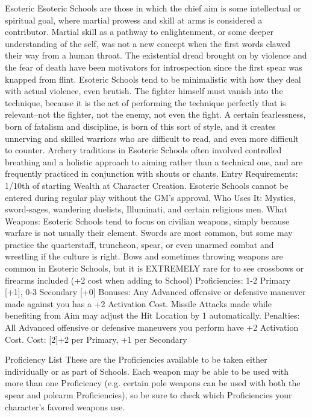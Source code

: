 \documentclass[oneside,11pt,english]{book}
\begin{document}
Esoteric 
Esoteric Schools are those in which the chief aim is some intellectual or spiritual goal, where martial 
prowess and skill at arms is considered a contributor. Martial skill as a pathway to enlightenment, or some 
deeper understanding of the self, was not a new concept when the first words clawed their way from a 
human throat. The existential dread brought on by violence and the fear of death have been motivators for 
introspection since the first spear was knapped from flint. 
Esoteric Schools tend to be minimalistic with how they deal with actual violence, even brutish. The 
fighter himself must vanish into the technique, because it is the act of performing the technique perfectly 
that is relevant--not the fighter, not the enemy, not even the fight. A certain fearlessness, born of fatalism 
and discipline, is born of this sort of style, and it creates unnerving and skilled warriors who are difficult 
to read, and even more difficult to counter. Archery traditions in Esoteric Schools often involved 
controlled breathing and a holistic approach to aiming rather than a technical one, and are frequently 
practiced in conjunction with shouts or chants. 
Entry Requirements: 1/10th of starting Wealth at Character Creation. Esoteric Schools cannot be entered 
during regular play without the GM’s approval. 
Who Uses It: Mystics, sword-sages, wandering duelists, Illuminati, and certain religious men. 
What Weapons: Esoteric Schools tend to focus on civilian weapons, simply because warfare is not 
usually their element. Swords are most common, but some may practice the quarterstaff, truncheon, spear, 
or even unarmed combat and wrestling if the culture is right. Bows and sometimes throwing weapons are 
common in Esoteric Schools, but it is EXTREMELY rare for to see crossbows or firearms included (+2 
cost when adding to School) 
Proficiencies: 1-2 Primary [+1], 0-3 Secondary [+0] 
Bonuses: Any Advanced offensive or defensive maneuver made against you has a +2 Activation Cost. 
Missile Attacks made while benefiting from Aim may adjust the Hit Location by 1 automatically. 
Penalties: All Advanced offensive or defensive maneuvers you perform have +2 Activation Cost. 
Cost: [2]+2 per Primary, +1 per Secondary 

 

 

Proficiency List 
These are the Proficiencies available to be taken either individually or as part of Schools. Each weapon 
may be able to be used with more than one Proficiency (e.g. certain pole weapons can be used with both 
the spear and polearm Proficiencies), so be sure to check which Proficiencies your character’s favored 
weapons use. 
\end{document}

